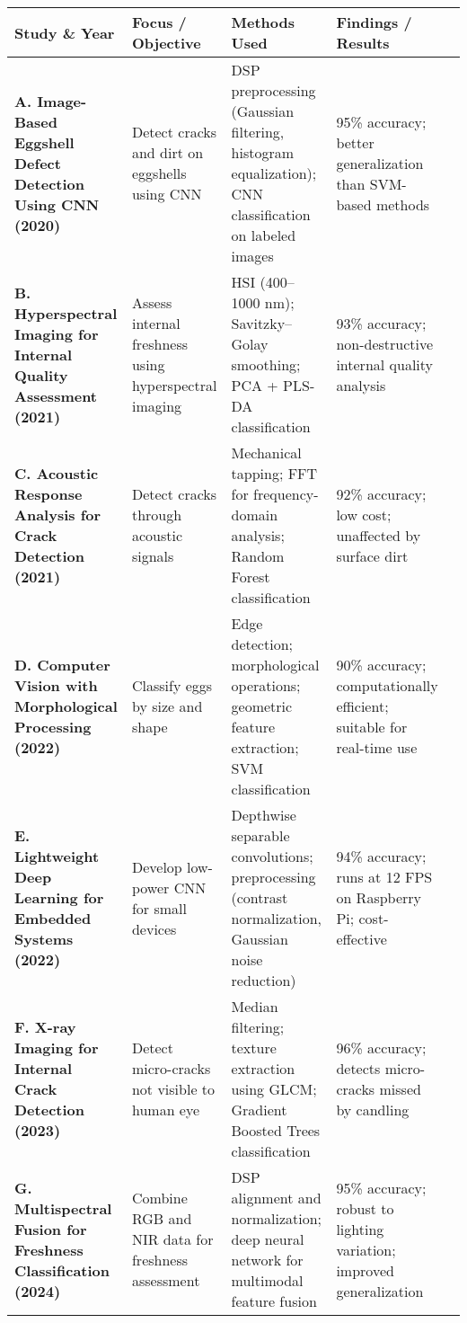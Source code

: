 \documentclass[conference]{IEEEtran}
\begin{document}
	\begin{table*}[htbp]
		\centering
		\caption{Summary of Reviewed Studies on Automated Egg Classification (2020–2025)}
		\label{tab:reviewed_studies}
		\begin{tabular}{|p{3cm}|p{3cm}|p{3cm}|p{3cm}|p{3cm}|}
			\hline
			\textbf{Study \& Year} & \textbf{Focus / Objective} & \textbf{Methods Used} & \textbf{Findings / Results} \\
			\hline
			\textbf{A. Image-Based Eggshell Defect Detection Using CNN (2020)} & Detect cracks and dirt on eggshells using CNN & DSP preprocessing (Gaussian filtering, histogram equalization); CNN classification on labeled images & 95\% accuracy; better generalization than SVM-based methods \\
			\hline
			\textbf{B. Hyperspectral Imaging for Internal Quality Assessment (2021)} & Assess internal freshness using hyperspectral imaging & HSI (400–1000 nm); Savitzky–Golay smoothing; PCA + PLS-DA classification & 93\% accuracy; non-destructive internal quality analysis \\
			\hline
			\textbf{C. Acoustic Response Analysis for Crack Detection (2021)} & Detect cracks through acoustic signals & Mechanical tapping; FFT for frequency-domain analysis; Random Forest classification & 92\% accuracy; low cost; unaffected by surface dirt \\
			\hline
			\textbf{D. Computer Vision with Morphological Processing (2022)} & Classify eggs by size and shape & Edge detection; morphological operations; geometric feature extraction; SVM classification & 90\% accuracy; computationally efficient; suitable for real-time use \\
			\hline
			\textbf{E. Lightweight Deep Learning for Embedded Systems (2022)} & Develop low-power CNN for small devices & Depthwise separable convolutions; preprocessing (contrast normalization, Gaussian noise reduction) & 94\% accuracy; runs at 12 FPS on Raspberry Pi; cost-effective \\
			\hline
			\textbf{F. X-ray Imaging for Internal Crack Detection (2023)} & Detect micro-cracks not visible to human eye & Median filtering; texture extraction using GLCM; Gradient Boosted Trees classification & 96\% accuracy; detects micro-cracks missed by candling \\
			\hline
			\textbf{G. Multispectral Fusion for Freshness Classification (2024)} & Combine RGB and NIR data for freshness assessment & DSP alignment and normalization; deep neural network for multimodal feature fusion & 95\% accuracy; robust to lighting variation; improved generalization \\

\end{tabular}
\end{table*}
\end{document}
